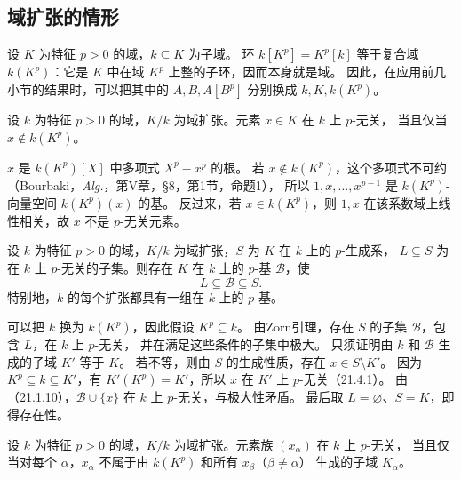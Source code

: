 \subsection{域扩张的情形}
设 $K$ 为特征 $p>0$ 的域，$k\subseteq K$ 为子域。
环 $k[K^p]=K^p[k]$ 等于复合域 $k(K^p)$：它是 $K$ 中在域 $K^p$ 上整的子环，因而本身就是域。
因此，在应用前几小节的结果时，可以把其中的 $A,B,A[B^p]$ 分别换成 $k,K,k(K^p)$。

设 $k$ 为特征 $p>0$ 的域，$K/k$ 为域扩张。元素 $x\in K$ 在 $k$ 上 $p$-无关，
当且仅当 $x\notin k(K^p)$。

\eproof
$x$ 是 $k(K^p)[X]$ 中多项式 $X^p-x^p$ 的根。
若 $x\notin k(K^p)$，这个多项式不可约
（Bourbaki，\textit{Alg.}，第V章，§8，第1节，命题1），
所以 $1,x,\ldots,x^{p-1}$ 是 $k(K^p)$-向量空间 $k(K^p)(x)$ 的基。
反过来，若 $x\in k(K^p)$，则 $1,x$ 在该系数域上线性相关，故 $x$ 不是 $p$-无关元素。
\finishproof

设 $k$ 为特征 $p>0$ 的域，$K/k$ 为域扩张，$S$ 为 $K$ 在 $k$ 上的 $p$-生成系，
$L\subseteq S$ 为在 $k$ 上 $p$-无关的子集。则存在 $K$ 在 $k$ 上的 $p$-基 $\mathcal B$，使
\[
 L\subseteq\mathcal B\subseteq S.
\]
特别地，$k$ 的每个扩张都具有一组在 $k$ 上的 $p$-基。

\eproof
可以把 $k$ 换为 $k(K^p)$，因此假设 $K^p\subseteq k$。
由Zorn引理，存在 $S$ 的子集 $\mathcal B$，包含 $L$，在 $k$ 上 $p$-无关，
并在满足这些条件的子集中极大。
只须证明由 $k$ 和 $\mathcal B$ 生成的子域 $K'$ 等于 $K$。
若不等，则由 $S$ 的生成性质，存在 $x\in S\setminus K'$。
因为 $K^p\subseteq k\subseteq K'$，有 $K'(K^p)=K'$，所以 $x$ 在 $K'$ 上 $p$-无关（21.4.1）。
由（21.1.10），$\mathcal B\cup\{x\}$ 在 $k$ 上 $p$-无关，与极大性矛盾。
最后取 $L=\varnothing$、$S=K$，即得存在性。
\finishproof

设 $k$ 为特征 $p>0$ 的域，$K/k$ 为域扩张。元素族 $(x_\alpha)$ 在 $k$ 上 $p$-无关，
当且仅当对每个 $\alpha$，$x_\alpha$ 不属于由 $k(K^p)$ 和所有 $x_\beta$（$\beta\ne\alpha$）
生成的子域 $K_\alpha$。

